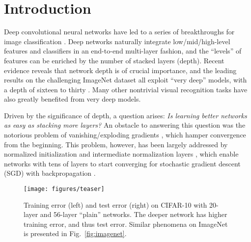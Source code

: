 \documentclass{article}
\begin{document}


\vspace{-1em}
\section{Introduction}
\label{sec:intro}

Deep convolutional neural networks \cite{LeCun1989,Krizhevsky2012} have led to a series of breakthroughs for image classification \cite{Krizhevsky2012,Zeiler2014,Sermanet2014}. Deep networks naturally integrate low/mid/high-level features \cite{Zeiler2014} and classifiers in an end-to-end multi-layer fashion, and the ``levels'' of features can be enriched by the number of stacked layers (depth).
Recent evidence \cite{Simonyan2015,Szegedy2015} reveals that network depth is of crucial importance, and the leading results \cite{Simonyan2015,Szegedy2015,He2015,Ioffe2015} on the challenging ImageNet dataset \cite{Russakovsky2014} all exploit ``very deep'' \cite{Simonyan2015} models, with a depth of sixteen \cite{Simonyan2015} to thirty \cite{Ioffe2015}. Many other nontrivial visual recognition tasks \cite{Girshick2014,He2014,Girshick2015,Ren2015,Long2015} have also greatly benefited from very deep models.

Driven by the significance of depth, a question arises: \emph{Is learning better networks as easy
as stacking more layers?}
An obstacle to answering this question was the notorious problem of vanishing/exploding gradients \cite{Bengio1994,Glorot2010}, which hamper convergence from the beginning. This problem, however, has been largely addressed by normalized initialization \cite{LeCun1998,Glorot2010,Saxe2013,He2015} and intermediate normalization layers \cite{Ioffe2015}, which enable networks with tens of layers to start converging for stochastic gradient descent (SGD) with backpropagation \cite{LeCun1989}.

\begin{figure}[t]
\begin{center}
\texttt{[image: figures/teaser]}
\end{center}
\vspace{-1.2em}
\caption{Training error (left) and test error (right) on CIFAR-10 with 20-layer and 56-layer ``plain'' networks. The deeper network has higher training error, and thus test error. Similar phenomena on ImageNet is presented in Fig.~\ref{fig:imagenet}.}
\label{fig:teaser}
\vspace{-1em}
\end{figure}
\end{document}
